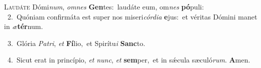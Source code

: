 \lettrine{\initial\textcolor{\initialcolor}{L}}{audáte} Dómi\-\textit{num}\-, \textit{om}\-\textit{nes} \textbf{Gen}\-tes:~\star laudáte eum, om\textit{nes} \textbf{pó}\-puli:\\
{\numbfont\textcolor{\numbcolor}{~2.}}~Quóniam confirmáta est super nos miseri\-\textit{cór}\-\textit{di}\textit{a} \textbf{e}\-jus:~\star et véritas Dómini manet in \textit{æ}\-\textbf{tér}num.\par
{\numbfont\textcolor{\numbcolor}{~3.}}~Glória \textit{Pa}\-\textit{tri}, \textit{et} \textbf{Fí}\-lio,~\star et Spirítu\textit{i} \textbf{Sanc}\-to.\par
{\numbfont\textcolor{\numbcolor}{~4.}}~Sicut erat in princípio, \textit{et} \textit{nunc}\-, \textit{et} \textbf{sem}\-per,~\star et in sǽcula sæculó\-\textit{rum}\-. \textbf{A}\-men.\par
